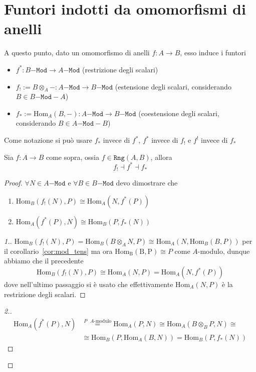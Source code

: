 \section{Funtori indotti da omomorfismi di anelli}

A questo punto, dato un omomorfismo di anelli \(f : A \to B\), esso induce i
funtori
\begin{itemize}[label = --]
    \item \(f^{*}: B\mathtt{-Mod} \to A\mathtt{-Mod}\) (restrizione degli
        scalari)
    \item \(f_! := B \otimes_A - : A\mathtt{-Mod} \to B\mathtt{-Mod}\)
        (estensione degli scalari, considerando \(B \in B\mathtt{-Mod-}A\))
    \item \(f_* := \mathrm{Hom}_A {(B, -)} : A\mathtt{-Mod} \to B\mathtt{-Mod}\)
        (coestensione degli scalari, considerando \(B \in A\mathtt{-Mod-}B\))
\end{itemize}

Come notazione si può usare \(f_*\) invece di \(f^{*}\), \(f^{*}\) invece di
\(f_!\) e \(f^{!}\) invece di \(f_*\) 

\begin{proposition}{}
    Sia \(f: A \to B\) come sopra, ossia \(f \in \mathtt{Rng}{(A,
    B)}\), allora
    \[
      f_! \dashv f^{*} \dashv f_*
    \]
\end{proposition}

\begin{proof}{}
    \(\forall N \in A\mathtt{-Mod}\) e \(\forall B \in B\mathtt{-Mod}\) devo
    dimostrare che
\begin{enumerate}[label = \arabic*.]
    \item \(\mathrm{Hom}_B{(f_!{(N)}, P)} \cong \mathrm{Hom}_A {(N, f^{*}{(P)})}\) 
    \item \(\mathrm{Hom}_A {(f^{*}{(P)}, N)} \cong \mathrm{Hom}_B{(P, f_*{(N)})}\) 
\end{enumerate}

\begin{proof}[1.]
    \(\mathrm{Hom}_B{(f_!{(N)}, P)} = \mathrm{Hom}_B{(B\otimes_A N, P)} \cong
    \mathrm{Hom}_A {(N, \mathrm{Hom}_B{(B, P)})} \) per il
    corollario~\ref{cor:mod_tens} ma ora \(\mathrm{Hom_B{(B, P)}} \cong P\) come
    \(A\)-modulo, dunque abbiamo che il precedente 
    \[
      \mathrm{Hom}_B{(f_!{(N)}, P)} \cong \mathrm{Hom}_A {(N, P)} =
      \mathrm{Hom}_A {(N, f^{*}{(P)})}
    \]
    dove nell'ultimo passaggio si è usato che effettivamente
    \(\mathrm{Hom}_A{(N, P)}\) è la restrizione degli scalari.
\end{proof}

\begin{proof}[2.]
    \begin{align*}
        \mathrm{Hom}_A {(f^{*}{(P)}, N)} &\overset{\text{\(P\) \(A\)-modulo}}{=}
        \mathrm{Hom}_A {(P, N)} \cong \mathrm{Hom}_A {(B \otimes_B P, N)} \cong \\ &\cong
      \mathrm{Hom}_B{(P, \mathrm{Hom}_A{(B, N)})} = \mathrm{Hom}_B{(P, f_*{(N)})}
    \end{align*}
\end{proof}
\end{proof}

